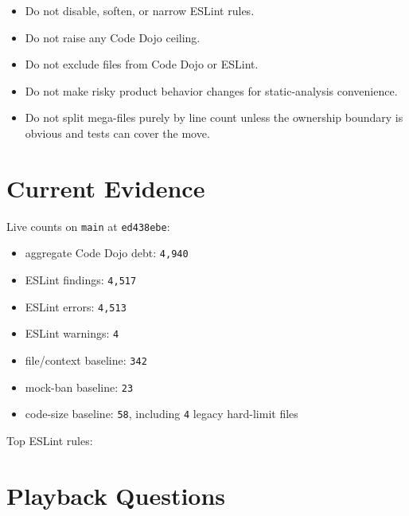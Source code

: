 \begin{itemize}
\tightlist
\item
  Do not disable, soften, or narrow ESLint rules.
\item
  Do not raise any Code Dojo ceiling.
\item
  Do not exclude files from Code Dojo or ESLint.
\item
  Do not make risky product behavior changes for static-analysis convenience.
\item
  Do not split mega-files purely by line count unless the ownership boundary is obvious and tests can cover the move.
\end{itemize}

\section{Current Evidence}\label{record-217-current-evidence}

Live counts on \texttt{m\allowbreak{}a\allowbreak{}i\allowbreak{}n} at \texttt{e\allowbreak{}d\allowbreak{}4\allowbreak{}3\allowbreak{}8\allowbreak{}e\allowbreak{}b\allowbreak{}e}:

\begin{itemize}
\tightlist
\item
  aggregate Code Dojo debt: \texttt{4\allowbreak{},\allowbreak{}9\allowbreak{}4\allowbreak{}0}
\item
  ESLint findings: \texttt{4\allowbreak{},\allowbreak{}5\allowbreak{}1\allowbreak{}7}
\item
  ESLint errors: \texttt{4\allowbreak{},\allowbreak{}5\allowbreak{}1\allowbreak{}3}
\item
  ESLint warnings: \texttt{4}
\item
  file/context baseline: \texttt{3\allowbreak{}4\allowbreak{}2}
\item
  mock-ban baseline: \texttt{2\allowbreak{}3}
\item
  code-size baseline: \texttt{5\allowbreak{}8}, including \texttt{4} legacy hard-limit files
\end{itemize}

Top ESLint rules:



\section{Playback Questions}\label{record-217-playback-questions}

